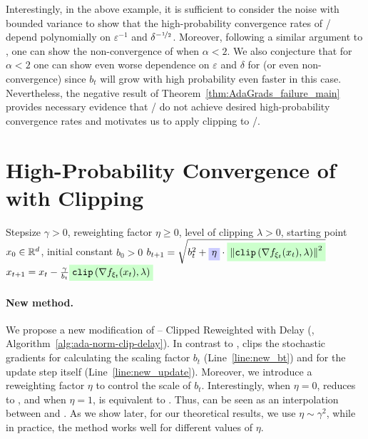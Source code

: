 \documentclass{article}
\begin{document}
Interestingly, in the above example, it is sufficient to consider the noise with bounded variance to show that the high-probability convergence rates of / depend polynomially on $\varepsilon^{-1}$ and $\delta^{-\nicefrac{1}{2}}$. Moreover, following a similar argument to \citep[Remark 1]{zhang2020adaptive}, one can show the non-convergence of  when $\alpha < 2$. We also conjecture that for $\alpha < 2$ one can show even worse dependence on $\varepsilon$ and $\delta$ for  (or even non-convergence) since $b_t$ will grow with high probability even faster in this case. Nevertheless, the negative result of Theorem~\ref{thm:AdaGrads_failure_main} provides necessary evidence that / do not achieve desired high-probability convergence rates and motivates us to apply clipping to /.

\section{High-Probability Convergence of  with Clipping} \label{section:convergence}

\begin{algorithm}
   \caption{\colorbox{green!20}{Clipped} \colorbox{blue!20}{Reweighted}  with Delay ()}
   \label{alg:ada-norm-clip-delay}
\begin{algorithmic}[1]
  \REQUIRE Stepsize $\gamma > 0$, reweighting factor $\eta \geq 0$, level of clipping $\lambda > 0$, starting point $x_0 \in {\mathbb R}^d$, initial constant $b_0 > 0$
        \STATE \label{line:new_bt} $b_{t+1} = \sqrt{b_{t}^2 +\text{\colorbox{blue!20}{$\eta$}}\cdot\text{\colorbox{green!20}{$\sqn{\clip\left(\nabla f_{\xi_t}(x_t), \lambda\right)}$}}}$
        \STATE \label{line:new_update} $x_{t+1} = x_t - \frac{\gamma}{b_{t}}\text{\colorbox{green!20}{$\clip\left(\nabla f_{\xi_t}(x_t), \lambda\right)$}}$
   \ENDFOR
\end{algorithmic}
\end{algorithm}

\paragraph{New method.} We propose a new modification of  -- Clipped Reweighted  with Delay (, Algorithm~\ref{alg:ada-norm-clip-delay}). In contrast to ,  clips the stochastic gradients for calculating the scaling factor $b_t$ (Line~\ref{line:new_bt}) and for the update step itself (Line~\ref{line:new_update}). Moreover, we introduce a reweighting factor $\eta$ to control the scale of $b_t$. Interestingly, when $\eta = 0$,  reduces to , and when $\eta = 1$,  is equivalent to . Thus,  can be seen as an interpolation between  and . As we show later, for our theoretical results, we use $\eta \sim \gamma^2$, while in practice, the method works well for different values of $\eta$.
\end{document}
